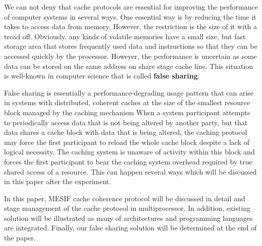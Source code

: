 \par We can not deny that cache protocols are essential for improving the performance of computer systems in several ways. One essential way is by reducing 
the time it takes to access data from memory. However, the restriction is the size of it with a tread off.
Obviously, any kinds of volatile memories have a small size, but fast storage area that stores frequently used data and instructions so that they can be 
accessed quickly by the processor. However, the performance is uncertain as some data can be stored on the same address on share stage cache line.
This situation is well-known in computer science that is called \textbf{false sharing}.

\par False sharing is essentially a performance-degrading usage pattern  that can arise in systems with distributed, coherent caches at the size of the smallest 
resource block managed by the caching mechanism When a system participant attempts to periodically access data that is not being altered by another party, but that 
data shares a cache block with data that is being altered, the caching protocol may force the first participant to reload the whole cache block despite a lack of logical necessity.
The caching system is unaware of activity within this block and forces the first participant to bear the caching system overhead required by true shared access of a resource.
This can happen several ways which will be discussed in this paper after the experiment.

In this paper, MESIF cache coherence protocol will be discussed in detail and stage management of the cache protocol in multiprocessor.
In addition, existing solution will be illustrated as many of architectures and programming languages are integrated. Finally, our false sharing 
solution will be determined at the end of the paper.